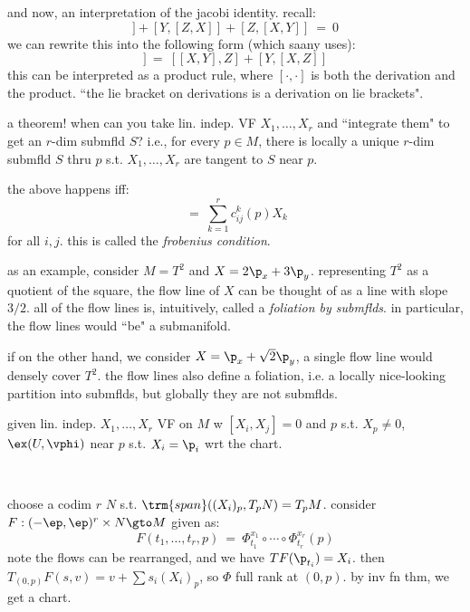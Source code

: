 and now, an interpretation of the jacobi identity. recall:
\begin{equation*}
	[X,[Y,Z]] + [Y,[Z,X]] + [Z,[X,Y]] \ = \ 0
\end{equation*}
we can rewrite this into the following form (which saany uses):
\begin{equation*}
	[X,[Y,Z]] \ = \ [[X,Y],Z] + [Y,[X,Z]]
\end{equation*}
this can be interpreted as a product rule, where $[\cdot,\cdot]$ is both
the derivation and the product.
``the lie bracket on derivations is a derivation on lie brackets".

a theorem! when can you take lin. indep. VF $X_{1},\dots,X_{r}$ and ``integrate them" to
get an $r$-dim submfld $S$?
i.e., for every $p\in M$, there is locally a unique $r$-dim submfld $S$ thru $p$
s.t. $X_{1},\dots,X_{r}$ are tangent to $S$ near $p$.

\begin{thm}[title=Frobenius' Theorem]
	the above happens iff:
	\begin{equation*}
		[X_{i},X_{j}] \ = \ \sum_{k=1}^{r}c_{ij}^{k}(p)X_{k}
	\end{equation*}
	for all $i,j$. this is called the \textit{frobenius condition}.
\end{thm}
as an example, consider $M=T^{2}$ and $X=2\p_{x}+3\p_{y}$.
representing $T^{2}$ as a quotient of the square, the flow line of $X$ can
be thought of as a line with slope $3/2$.
all of the flow lines is, intuitively, called a \textit{foliation by submflds}.
in particular, the flow lines would ``be" a submanifold.

if on the other hand, we consider $X=\p_{x}+\sqrt{2}\p_{y}$, a single
flow line would densely cover $T^{2}$.
the flow lines also define a foliation, i.e. a locally nice-looking
partition into submflds, but globally they are not submflds.

\begin{lm}[title=Flow-straightening lemma]
	given lin. indep. $X_{1},\dots,X_{r}$ VF on $M$ w $[X_{i},X_{j}]=0$ and
	$p$ s.t. $X_{p}\neq0$, $\ex(U,\vphi)$ near $p$ s.t. $X_{i}=\p_{i}$ wrt the chart.
\end{lm} \

\begin{pf}
	choose a codim $r$ $N$ s.t. $\trm{span}((X_{i})_{p},T_{p}N)=T_{p}M$.
	consider $F:(-\ep,\ep)^{r}\times N\gto M$ given as:
	\begin{equation*}
		F(t_{1},\dots,t_{r},p) \ = \ \Phi_{t_{1}}^{x_{1}}\circ\cdots\circ\Phi_{t_{r}}^{x_{r}}(p)
	\end{equation*}
	note the flows can be rearranged, and we have $TF(\p_{t_{i}})=X_{i}$.
	then $T_{(0,p)}F(s,v)=v+\sum s_{i}(X_{i})_{p}$, so $\Phi$ full rank at $(0,p)$.
	by inv fn thm, we get a chart.
\end{pf}

